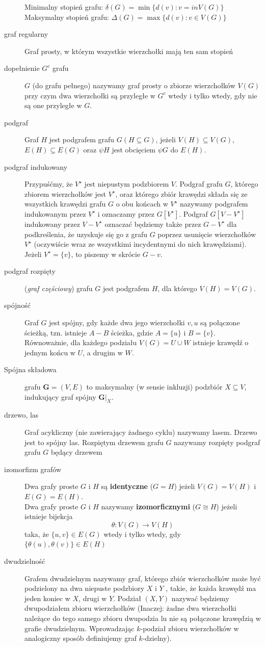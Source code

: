 \documentclass[a4paper,12pt]{article}
\theoremstyle{definition}%
\theoremstyle{definition}
\theoremstyle{problem}
\begin{document}
\begin{description}
Minimalny stopień grafu: $\delta (G) = \min \{d(v):v=in V(G)\}$\\
Maksymalny stopień grafu: $\Delta (G) = \max \{d(v):v\in V(G)\}$
\item[graf regularny] Graf prosty, w którym wszystkie wierzchołki mają ten sam stopień
\item[dopełnienie $G^c$ grafu] $G$ (do grafu pełnego) nazywamy graf prosty o zbiorze
wierzchołków $V (G)$ przy czym dwa wierzchołki są przyległe w $G^c$ wtedy i tylko wtedy, gdy nie są one przyległe w $G$.
\item[podgraf] Graf $H$ jest podgrafem grafu $G (H \subseteq G )$, jeżeli $V(H) \subseteq V(G)$, $E(H) \subseteq E(G)$ oraz $\psi H$ jest obcięciem $\psi G$ do $E(H)$.
\item[podgraf indukowany] Przypuśćmy, że $V^\star$ jest niepustym podzbiorem $V$. Podgraf grafu $G$, którego zbiorem wierzchołków jest $V^\star$, oraz którego zbiór krawędzi składa się ze wszystkich krawędzi grafu $G$ o obu końcach w $V^\star$ nazywamy podgrafem indukowanym przez $V^\star $ i oznaczamy przez $G[V^\star ]$. Podgraf $G[V -V^\star ]$ indukowany przez $V - V^\star $ oznaczać będziemy także przez $G - V^\star$ dla podkreślenia, że uzyskuje się go z grafu $G$ poprzez usunięcie wierzchołków $V^\star $ (oczywiście wraz ze wszystkimi incydentnymi do nich krawędziami). Jeżeli $V^\star = \{v\}$, to piszemy w skrócie $G - v$.
\item[podgraf rozpięty] (\textit{graf częściowy}) grafu $G$ jest podgrafem $H$, dla którego $V (H) = V (G)$.
\item[spójność] Graf $G$ jest spójny, gdy każde dwa jego wierzchołki $v, u$ są połączone ścieżką, tzn. istnieje $A - B$ ścieżka, gdzie $A = \{u\}$ i $B = \{v\}$. Równoważnie, dla każdego podziału $V (G) = U\cup W$ istnieje krawędź o jednym końcu w $U$, a drugim w $W$.
\item[Spójna składowa] grafu $\mathbf{G}=\left(V,E\right)$ to maksymalny (w sensie inkluzji) podzbiór $X\subseteq V$, indukujący graf spójny $\mathbf{G}|_X$.
\item[drzewo, las] Graf acykliczny (nie zawierający żadnego cyklu) nazywamy lasem. Drzewo jest to spójny las. Rozpiętym drzewem grafu $G$ nazywamy rozpięty podgraf grafu $G$ będący drzewem
\item[izomorfizm grafów] Dwa grafy proste $G$ i $H$ są \textbf{identyczne} ($G = H$) jeżeli $V(G) = V(H)$ i $E(G) = E(H)$.\\
Dwa grafy proste $G$ i $H$ nazywamy \textbf{izomorficznymi} ($G \cong H$) jeżeli istnieje bijekcja
$$\theta :V(G)\rightarrow V(H)$$
taka, że
$\{u, v\} \in E(G)$ wtedy i tylko wtedy, gdy $\{\theta (u), \theta (v)\} \in E(H)$
\item[dwudzielność] Grafem dwudzielnym nazywamy graf, którego zbiór wierzchołków może być podzielony na dwa niepuste podzbiory $X$ i $Y$ , takie, że każda krawędź ma jeden koniec w $X$, drugi w $Y$. Podział $(X, Y)$ nazywać będziemy dwupodziałem zbioru wierzchołków (Inaczej: żadne dwa wierzchołki należące do tego samego zbioru dwupodzia lu nie są połączone krawędzią w grafie dwudzielnym. Wprowadzając $k$-podział zbioru wierzchołków w analogiczny sposób definiujemy graf $k$-dzielny).
\end{description}
\end{document}
